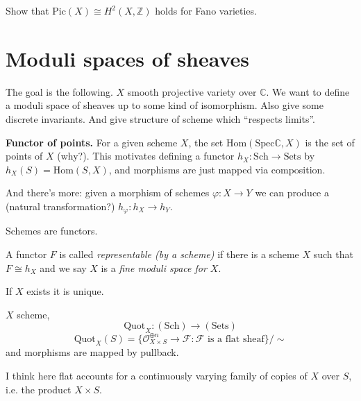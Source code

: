 \begin{exercise}
\label{exercise-Pic-H2-Fano}
Show that  $\text{Pic}(X)\cong H^{2}(X,\mathbb{Z})$ holds for Fano varieties.
\end{exercise}

\section{Moduli spaces of sheaves}
\label{section-moduli-spaces-of-sheaves}

The goal is the following. $X$ smooth projective variety over $\mathbb{C}$. We
want to define a moduli space of sheaves up to some kind of isomorphism. Also
give some discrete invariants. And give structure of scheme which ``respects
limits''.

{\bf Functor of points.} For a given scheme $X$, the set
$\text{Hom}(\text{Spec}\mathbb{C},X)$ is the set of points of $X$ (why?). This motivates
defining a functor $h_X:\text{Sch}\to \text{Sets}$ by $h_X(S)=\text{Hom}(S,X)$,
and morphisms are just mapped via composition.

And there's more: given a morphism of schemes $\varphi:X\to Y$ we can produce a
(natural transformation?) $h_\varphi:h_X \to h_Y$.

\begin{slogan}
Schemes are functors.
\end{slogan}

\begin{definition}
\label{definition-representable-functor-by-scheme}
A functor $F$ is called {\it representable (by a scheme)} if there is a scheme
$X$ such that $F\cong h_X$ and we say $X$ is a {\it fine moduli space for $X$}.
\end{definition}

\begin{remark}
\label{remark-uniqueness-of-representable-functor}
If $X$ exists it is unique.
\end{remark}

\begin{example}
\label{example-quotient-sheaf}
$X$ scheme,
$$
\text{Quot}_X:(\text{Sch})\to (\text{Sets})
$$
$$
\text{Quot}_X(S)=\{
\mathcal{O}_{X \times S}^{\oplus n}\to\mathcal{F}
:\mathcal{F} \text{ is a flat sheaf}\}\Big/ \sim
$$
and morphisms are mapped by pullback.
\end{example}

I think here flat accounts for a continuously varying family of copies of $X$
over $S$, i.e. the product $X \times S$.


